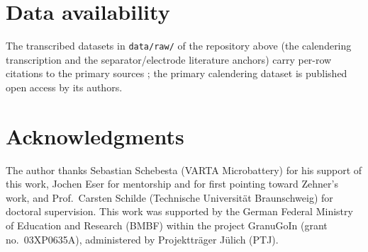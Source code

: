 \documentclass[10pt,a4paper]{article}
\begin{document}
\section*{Data availability}
The transcribed datasets in \texttt{data/raw/} of the repository above (the calendering transcription and the separator/electrode literature anchors) carry per-row citations to the primary sources \cite{gandert2023,richter2017,marconnet2018,burheim2013,vishwakarma2015}; the primary calendering dataset is published open access by its authors.

\section*{Acknowledgments}
The author thanks Sebastian Schebesta (VARTA Microbattery) for his support of this work, Jochen Eser for mentorship and for first pointing toward Zehner's work, and Prof.\ Carsten Schilde (Technische Universit\"at Braunschweig) for doctoral supervision. This work was supported by the German Federal Ministry of Education and Research (BMBF) within the project GranuGoIn (grant no.\ 03XP0635A), administered by Projekttr\"ager J\"ulich (PTJ).
\end{document}
